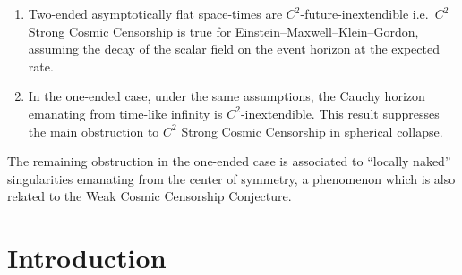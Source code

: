 \documentclass[10pt,a4paper]{article}
\theoremstyle{plain}
\theoremstyle{remark}
\theoremstyle{definition}
\theoremstyle{plain}
\theoremstyle{remark}
\theoremstyle{definition}
\numberwithin{equation}{section}
\begin{document}
 	
 	
 	\begin{enumerate}
 		\item Two-ended asymptotically flat space-times are $C^2$-future-inextendible i.e.\  $C^2$ Strong Cosmic Censorship is true for Einstein--Maxwell--Klein--Gordon, assuming the decay of the scalar field on the event horizon at the expected rate.
 		
 		\item  In the one-ended case, under the same assumptions, the Cauchy horizon emanating from time-like infinity is $C^2$-inextendible. This result suppresses the main obstruction to $C^2$ Strong Cosmic Censorship in spherical collapse.
 	\end{enumerate} The remaining obstruction in the one-ended case is associated to ``locally naked'' singularities emanating from the center of symmetry, a phenomenon which is also related to the Weak Cosmic Censorship Conjecture.
 	
 	
 	
 	
 	
 	\section{Introduction}
 	
\end{document}
